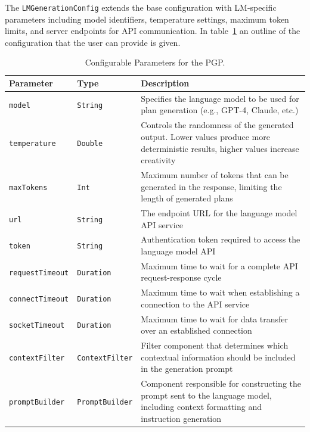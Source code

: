 \documentclass[12pt,a4paper,openright,twoside]{book}
\begin{document}
The \texttt{LMGenerationConfig} extends the base configuration with LM-specific parameters including model identifiers, temperature settings, maximum token limits, and server endpoints for API communication.
%
In table~\ref{pgp-params} an outline of the configuration that the user can provide is given.

\begin{table}[htbp]
\centering
\begin{tabular}{|l|l|p{7cm}|}
\hline
\textbf{Parameter} & \textbf{Type} & \textbf{Description} \\
\hline
\texttt{model} & \texttt{String} & Specifies the language model to be used for plan generation (e.g., GPT-4, Claude, etc.) \\
\hline
\texttt{temperature} & \texttt{Double} & Controls the randomness of the generated output. Lower values produce more deterministic results, higher values increase creativity \\
\hline
\texttt{maxTokens} & \texttt{Int} & Maximum number of tokens that can be generated in the response, limiting the length of generated plans \\
\hline
\texttt{url} & \texttt{String} & The endpoint URL for the language model API service \\
\hline
\texttt{token} & \texttt{String} & Authentication token required to access the language model API \\
\hline
\texttt{requestTimeout} & \texttt{Duration} & Maximum time to wait for a complete API request-response cycle \\
\hline
\texttt{connectTimeout} & \texttt{Duration} & Maximum time to wait when establishing a connection to the API service \\
\hline
\texttt{socketTimeout} & \texttt{Duration} & Maximum time to wait for data transfer over an established connection \\
\hline
\texttt{contextFilter} & \texttt{ContextFilter} & Filter component that determines which contextual information should be included in the generation prompt \\
\hline
\texttt{promptBuilder} & \texttt{PromptBuilder} & Component responsible for constructing the prompt sent to the language model, including context formatting and instruction generation \\
\bottomrule
\end{tabular}
\caption{Configurable Parameters for the \ac{PGP}.}
\label{pgp-params}
\end{table}
\end{document}
